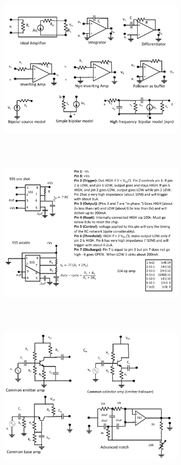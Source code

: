 \begin{figure} 
\center
\includegraphics[width=0.8\textwidth,natwidth=642,natheight=610, height=80mm, width=88mm]{circuit2.pdf}
\end{figure}
\begin{figure} 
\center
\includegraphics[width=0.8\textwidth,natwidth=642,natheight=610, height=80mm, width=88mm]{circuit3.pdf}
\end{figure}
\begin{figure} 
\center
\includegraphics[width=0.8\textwidth,natwidth=642,natheight=610, height=80mm, width=88mm]{circuit4.pdf}
\end{figure}
